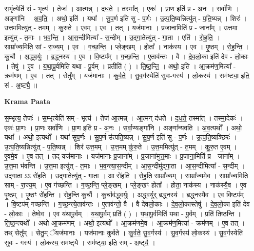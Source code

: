 \documentclass[17pt]{extarticle}
\begin{document}
स॒भृंत्येति॑ सं - भृत्य॑ । तेजः॑ । आ॒त्मन्न् । द॒ध॒ते॒ । तस्मा᳚त् । एकः॑ । प्रा॒ण इति॑ प्र - अ॒नः । सर्वा॑णि । अङ्गा॑नि । अ॒व॒ति॒ । अथो॒ इति॑ । यथा᳚ । सु॒प॒र्ण इति॑ सु - प॒र्णः । उ॒त्प॒ति॒ष्यन्नित्यु॑त् - प॒ति॒ष्यन्न् । शिरः॑ । उ॒त्त॒ममित्यु॑त् - त॒मम् । कु॒रु॒ते । ए॒वम् । ए॒व । तत् । यज॑मानाः । प्र॒जाना॒मिति॑ प्र - जाना᳚म् । उ॒त्त॒मा इत्यु॑त् - त॒माः । भ॒व॒न्ति॒ । आ॒स॒न्दीमित्या᳚ - स॒न्दीम् । उ॒द्गा॒तेत्यु॑त् - गा॒ता । एति॑ । रो॒ह॒ति॒ । साम्रा᳚ज्य॒मिति॒ सां - रा॒ज्य॒म् । ए॒व । ग॒च्छ॒न्ति॒ । प्ले॒ङ्खम् । होता᳚ । नाक॑स्य । ए॒व । पृ॒ष्ठम् । रो॒ह॒न्ति॒ । कू॒र्चौ । अ॒द्ध्व॒र्युः । ब्र॒द्ध्नस्य॑ । ए॒व । वि॒ष्टप᳚म् । ग॒च्छ॒न्ति॒ । ए॒ताव॑न्तः । वै । दे॒व॒लो॒का इति॑ देव - लो॒काः । तेषु॑ । ए॒व । य॒था॒पू॒र्वमिति॑ यथा - पू॒र्वम् । प्रतीति॑ ( ) । ति॒ष्ठ॒न्ति॒ । अथो॒ इति॑ । आ॒क्रम॑ण॒मित्या᳚ - क्रम॑णम् । ए॒व । तत् । सेतु᳚म् । यज॑मानाः । कु॒र्व॒ते॒ । सु॒व॒र्गस्येति॑ सुवः-गस्य॑ । लो॒कस्य॑ । सम॑ष्ट्या॒ इति॒ सं - अ॒ष्ट्यै॒ ॥  \newline


\textbf{Krama Paata} \newline

स॒म्भृत्य॒ तेजः॑ । स॒म्भृत्येति॑ सम् - भृत्य॑ । तेज॑ आ॒त्मन्न् । आ॒त्मन् द॑धते । द॒ध॒ते॒ तस्मा᳚त् । तस्मा॒देकः॑ । एकः॑ प्रा॒णः । प्रा॒णः सर्वा॑णि । प्रा॒ण इति॑ प्र - अ॒नः । सर्वा॒ण्यङ्‍गा॑नि । अङ्‍गा᳚न्यवति । अ॒व॒त्यथो᳚ । अथो॒ यथा᳚ । अथो॒ इत्यथो᳚ । यथा॑ सुप॒र्णः । सु॒प॒र्ण उ॑त्पति॒ष्यन्न् । सु॒प॒र्ण इति॑ सु - प॒र्णः । उ॒त्प॒ति॒ष्यञ्छिरः॑ । उ॒त्प॒ति॒ष्यन्नित्यु॑त् - प॒ति॒ष्यन्न् । शिर॑ उत्त॒मम् । उ॒त्त॒मम् कु॑रु॒ते । उ॒त्त॒ममित्यु॑त् - त॒मम् । कु॒रु॒त ए॒वम् । ए॒वमे॒व । ए॒व तत् । तद् यज॑मानाः । यज॑मानाः प्र॒जाना᳚म् । प्र॒जाना॑मुत्त॒माः । प्र॒जाना॒मिति॑ प्र - जाना᳚म् । उ॒त्त॒मा भ॑वन्ति । उ॒त्त॒मा इत्यु॑त् - त॒माः । भ॒व॒न्त्या॒स॒न्दीम् । आ॒स॒न्दीमु॑द्‍गा॒ता । आ॒स॒न्दीमित्या᳚ - स॒न्दीम् । उ॒द्‍गा॒ता ऽऽ रो॑हति । उ॒द्‍गा॒तेत्यु॑त् - गा॒ता । आ रो॑हति । रो॒ह॒ति॒ साम्रा᳚ज्यम् । साम्रा᳚ज्यमे॒व । साम्रा᳚ज्य॒मिति॒ साम् - रा॒ज्य॒म् । ए॒व ग॑च्छन्ति । ग॒च्छ॒न्ति॒ प्ले॒ङ्‍खम् । प्ले॒ङ्‍खꣳ होता᳚ । होता॒ नाक॑स्य । नाक॑स्यै॒व । ए॒व पृ॒ष्ठम् । पृ॒ष्ठꣳ रो॑हन्ति । रो॒ह॒न्ति॒ कू॒र्चौ । कू॒र्चाव॑द्ध्व॒र्युः । अ॒द्ध्व॒र्युर् ब्र॒द्ध्नस्य॑ । ब्र॒द्ध्नस्यै॒व । ए॒व वि॒ष्टप᳚म् । वि॒ष्टप॑म् गच्छन्ति । ग॒च्छ॒न्त्ये॒ताव॑न्तः । ए॒ताव॑न्तो॒ वै । वै दे॑वलो॒काः । दे॒व॒लो॒कास्तेषु॑ । दे॒व॒लो॒का इति॑ देव - लो॒काः । तेष्वे॒व । ए॒व य॑थापू॒र्वम् । य॒था॒पू॒र्वम् प्रति॑ ( ) । य॒था॒पू॒र्वमिति॑ यथा - पू॒र्वम् । प्रति॑ तिष्ठन्ति । ति॒ष्ठ॒न्त्यथो᳚ । अथो॑ आ॒क्रम॑णम् । अथो॒ इत्यथो᳚ । आ॒क्रम॑णमे॒व । आ॒क्रम॑ण॒मित्या᳚ - क्रम॑णम् । ए॒व तत् । तथ् सेतु᳚म् । सेतु॒म् ॅयज॑मानाः । यज॑मानाः कुर्वते । कु॒र्व॒ते॒ सु॒व॒र्गस्य॑ । सु॒व॒र्गस्य॑ लो॒कस्य॑ । सु॒व॒र्गस्येति॑ सुवः - गस्य॑ । लो॒कस्य॒ सम॑ष्ट्‍यै । सम॑ष्ट्‍या॒ इति॒ सम् - अ॒ष्ट्‍यै॒ । \newline
\end{document}

